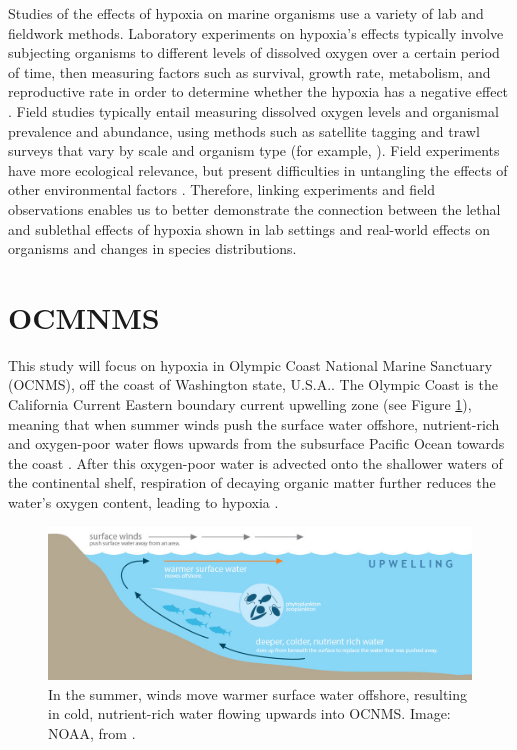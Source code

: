 \documentclass[12pt,twoside]{reedthesis}
\begin{document}
Studies of the effects of hypoxia on marine organisms use a variety of lab and fieldwork methods. Laboratory experiments on hypoxia's effects typically involve subjecting organisms to different levels of dissolved oxygen over a certain period of time, then measuring factors such as survival, growth rate, metabolism, and reproductive rate in order to determine whether the hypoxia has a negative effect \autocite{Steckbauer2020}. Field studies typically entail measuring dissolved oxygen levels and organismal prevalence and abundance, using methods such as satellite tagging and trawl surveys that vary by scale and organism type (for example, \autocite{Keister2020}). Field experiments have more ecological relevance, but present difficulties in untangling the effects of other environmental factors \autocite{Borges2022, Boyd2018}. Therefore, linking experiments and field observations enables us to better demonstrate the connection between the lethal and sublethal effects of hypoxia shown in lab settings and real-world effects on organisms and changes in species distributions.

\section{OCMNMS}

This study will focus on hypoxia in Olympic Coast National Marine Sanctuary (OCNMS), off the coast of Washington state, U.S.A.. The Olympic Coast is the California Current Eastern boundary current upwelling zone (see Figure \ref{Upwelling}), meaning that when summer winds push the surface water offshore, nutrient-rich and oxygen-poor water flows upwards from the subsurface Pacific Ocean towards the coast \autocite{OfficeofNationalMarineSanctuaries2022, Hickey2003}. After this oxygen-poor water is advected onto the shallower waters of the continental shelf, respiration of decaying organic matter further reduces the water's oxygen content, leading to hypoxia \autocite{Pierce2012}. 

\begin{figure}[!h]
	\begin{center}
		\includegraphics[scale=0.4]{Fig_NOAA_Upwelling}
		\caption[Upwelling]{\footnotesize{In the summer, winds move warmer surface water offshore, resulting in cold, nutrient-rich water flowing upwards into OCNMS. Image: NOAA, from \autocite{OceanographyOlympicCoast}.}} %
		\label{Upwelling}
	\end{center}
\end{figure} 
\end{document}

